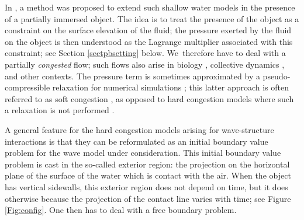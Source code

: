 \documentclass[JEP,XML,SOM,Unicode,NoFloatCountersInSection,published]{cedram}
\theoremstyle{definition}
\begin{document}
In \cite{Lannes2017}, a method was proposed to extend such shallow water models in the presence of a partially immersed object.
The idea is to treat the presence of the object as a constraint on the surface elevation of the fluid;
the pressure exerted by the fluid on the object is then understood as the Lagrange multiplier associated with this constraint;
see Section \ref{sectpbsetting} below. We~therefore have to deal with a partially {\it congested} flow;
such flows also arise in biology \cite{PQV}, collective dynamics \cite{DHN,MRSV}, and other contexts.
The pressure term is sometimes approximated by a pseudo-compressible relaxation for numerical simulations \cite{GPSW1,GPSW2};
this latter approach is often referred to as soft congestion \cite{Perrin},
as opposed to hard congestion models where such a relaxation is not performed \cite{ABP,DalibardPerrin1,DalibardPerrin2}.

A general feature for the hard congestion models arising for wave-structure interactions is that
they can be reformulated as an initial boundary value problem for the wave model under consideration.
This initial boundary value problem is cast in the so-called exterior region:
the projection on the horizontal plane of the surface of the water which is contact with the air.
When the object has vertical sidewalls, this exterior region does not depend on time,
but it does otherwise because the projection of the contact line varies with time; see Figure \ref{Fig:config}.
One then has to deal with a free boundary problem.
\end{document}
